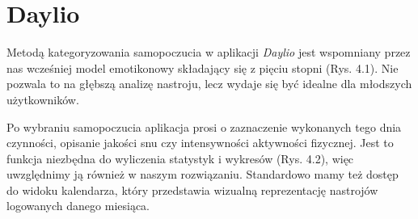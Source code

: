 \documentclass[inz, shortabstract]{iithesis}
\begin{document}
\section{Daylio}
Metodą kategoryzowania samopoczucia w aplikacji \textit{Daylio} jest wspomniany przez nas wcześniej model emotikonowy składający się z pięciu stopni (Rys. 4.1). Nie pozwala to na głębszą analizę nastroju, lecz wydaje się być idealne dla młodszych użytkowników. 

Po wybraniu samopoczucia aplikacja prosi o zaznaczenie wykonanych tego dnia czynności, opisanie jakości snu czy intensywności aktywności fizycznej. Jest to funkcja niezbędna do wyliczenia statystyk i wykresów (Rys. 4.2), więc uwzględnimy ją również w naszym rozwiązaniu. Standardowo mamy też dostęp do widoku kalendarza, który przedstawia wizualną reprezentację nastrojów logowanych danego miesiąca.
\end{document}
